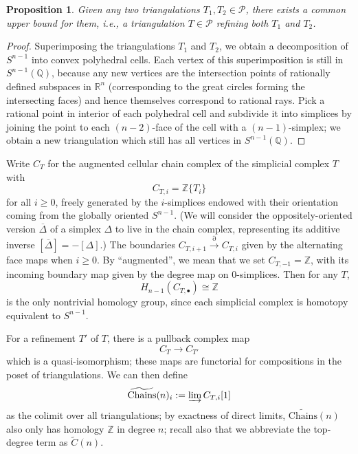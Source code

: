 \documentclass[10pt]{amsart}
\newtheorem{prop}[thm]{Proposition}
\theoremstyle{definition}
\newcommand{\Chains}{\mathrm{Chains}}
\numberwithin{equation}{section}
\begin{document}
    \begin{prop} \label{prop:refine}
        Given any two triangulations $T_1,T_2\in \mathcal{P}$, there exists a common upper bound for them, i.e., a triangulation $T\in \mathcal{P}$ refining both $T_1$ and $T_2$.
    \end{prop}
    \begin{proof}
        Superimposing the triangulations $T_1$ and $T_2$, we obtain a decomposition of $S^{n-1}$ into convex polyhedral cells. Each vertex of this superimposition is still in $S^{n-1}(\mathbb{Q})$, because any new vertices are the intersection points of rationally defined subspaces in $\mathbb{R}^n$ (corresponding to the great circles forming the intersecting faces) and hence themselves correspond to rational rays. Pick a rational point in interior of each polyhedral cell and subdivide it into simplices by joining the point to each $(n-2)$-face of the cell with a $(n-1)$-simplex; we obtain a new triangulation which still has all vertices in $S^{n-1}(\mathbb{Q})$. 
    \end{proof}

    Write $C_T$ for the augmented cellular chain complex of the simplicial complex $T$ with
    \[
    C_{T,i} = \mathbb{Z}\{T_i\}
    \]
    for all $i\ge 0$, freely generated by the $i$-simplices endowed with their orientation coming from the globally oriented $S^{n-1}$. (We will consider the oppositely-oriented version $\overline{\Delta}$ of a simplex $\Delta$ to live in the chain complex, representing its additive inverse $[\overline{\Delta}] = -[\Delta].$) The boundaries $C_{T,i+1}\xrightarrow{\partial} C_{T,i}$ given by the alternating face maps when $i\ge 0$. By ``augmented'', we mean that we set $C_{T,-1}=\mathbb{Z}$, with its incoming boundary map given by the degree map on $0$-simplices. Then for any $T$,
    \[
    H_{n-1}(C_{T,\bullet}) \cong \mathbb{Z}
    \]
    is the only nontrivial homology group, since each simplicial complex is homotopy equivalent to $S^{n-1}$.

    For a refinement $T'$ of $T$, there is a pullback complex map
    \[
    C_T \to C_{T'}
    \]
    which is a quasi-isomorphism; these maps are functorial for compositions in the poset of triangulations. We can then define
    \begin{equation} \label{eq:ind}
    \widetilde{\Chains}(n)_i := \varinjlim C_{T,i}[1]
    \end{equation}
    as the colimit over all triangulations; by exactness of direct limits, $\widetilde{\Chains}(n)$ also only has homology $\mathbb{Z}$ in degree $n$; recall also that we abbreviate the top-degree term as $\tilde{C}(n)$.
    
\end{document}
